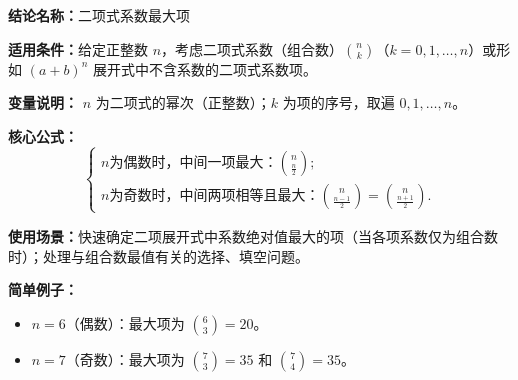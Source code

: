 \textbf{结论名称：}二项式系数最大项

\textbf{适用条件：}给定正整数 \(n\)，考虑二项式系数（组合数）\(\binom{n}{k}\)（\(k=0,1,\dots,n\)）或形如 \((a+b)^n\) 展开式中不含系数的二项式系数项。

\textbf{变量说明：} \(n\) 为二项式的幂次（正整数）；\(k\) 为项的序号，取遍 \(0,1,\dots,n\)。

\textbf{核心公式：}
\[
\boxed{
\begin{cases}
n \text{为偶数时，中间一项最大：} \displaystyle\binom{n}{\frac{n}{2}};\\[6pt]
n \text{为奇数时，中间两项相等且最大：} \displaystyle\binom{n}{\frac{n-1}{2}}=\binom{n}{\frac{n+1}{2}}.
\end{cases}
}
\]

\textbf{使用场景：}快速确定二项展开式中系数绝对值最大的项（当各项系数仅为组合数时）；处理与组合数最值有关的选择、填空问题。

\textbf{简单例子：}
\begin{itemize}
\item \(n=6\)（偶数）：最大项为 \(\displaystyle\binom{6}{3}=20\)。
\item \(n=7\)（奇数）：最大项为 \(\displaystyle\binom{7}{3}=35\) 和 \(\displaystyle\binom{7}{4}=35\)。
\end{itemize}
